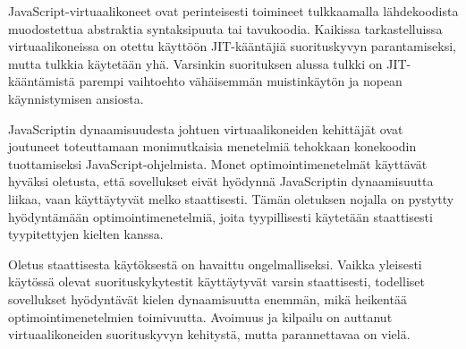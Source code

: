 JavaScript-virtuaalikoneet ovat perinteisesti toimineet tulkkaamalla lähdekoodista muodostettua abstraktia syntaksipuuta tai tavukoodia. Kaikissa tarkastelluissa virtuaalikoneissa on otettu käyttöön JIT-kääntäjiä suorituskyvyn parantamiseksi, mutta tulkkia käytetään yhä. Varsinkin suorituksen alussa tulkki on JIT-kääntämistä parempi vaihtoehto vähäisemmän muistinkäytön ja nopean käynnistymisen ansiosta.

JavaScriptin dynaamisuudesta johtuen virtuaalikoneiden kehittäjät ovat joutuneet toteuttamaan monimutkaisia menetelmiä tehokkaan konekoodin tuottamiseksi JavaScript-ohjelmista. Monet optimointimenetelmät käyttävät hyväksi oletusta, että sovellukset eivät hyödynnä JavaScriptin dynaamisuutta liikaa, vaan käyttäytyvät melko staattisesti. Tämän oletuksen nojalla on pystytty hyödyntämään optimointimenetelmiä, joita tyypillisesti käytetään staattisesti tyypitettyjen kielten kanssa.

Oletus staattisesta käytöksestä on havaittu ongelmalliseksi. Vaikka yleisesti käytössä olevat suorituskykytestit käyttäytyvät varsin staattisesti, todelliset sovellukset hyödyntävät kielen dynaamisuutta enemmän, mikä heikentää optimointimenetelmien toimivuutta. Avoimuus ja kilpailu on auttanut virtuaalikoneiden suorituskyvyn kehitystä, mutta parannettavaa on vielä.